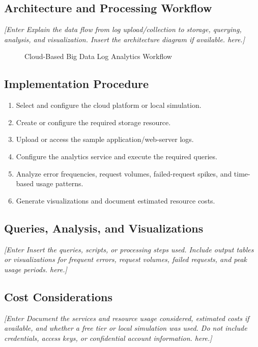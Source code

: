 \documentclass[12pt,a4paper]{report}
\newcommand{\placeholder}[1]{\textit{[Enter #1 here.]}}
\begin{document}
\subsection{Architecture and Processing Workflow}
\placeholder{Explain the data flow from log upload/collection to storage,
querying, analysis, and visualization. Insert the architecture diagram
if available.}

\begin{figure}[H]
    \centering
    \caption{Cloud-Based Big Data Log Analytics Workflow}
    \label{fig:cloud_log_workflow}
\end{figure}

\subsection{Implementation Procedure}
\begin{enumerate}
    \item Select and configure the cloud platform or local simulation.
    \item Create or configure the required storage resource.
    \item Upload or access the sample application/web-server logs.
    \item Configure the analytics service and execute the required queries.
    \item Analyze error frequencies, request volumes, failed-request spikes,
    and time-based usage patterns.
    \item Generate visualizations and document estimated resource costs.
\end{enumerate}

\subsection{Queries, Analysis, and Visualizations}
\placeholder{Insert the queries, scripts, or processing steps used.
Include output tables or visualizations for frequent errors, request
volumes, failed requests, and peak usage periods.}

\subsection{Cost Considerations}
\placeholder{Document the services and resource usage considered,
estimated costs if available, and whether a free tier or local simulation
was used. Do not include credentials, access keys, or confidential
account information.}
\end{document}
